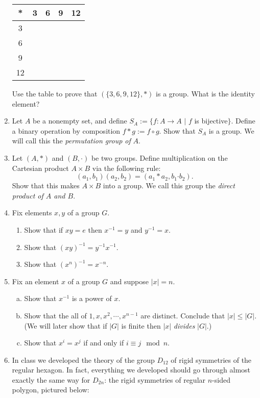 \documentclass[11pt]{article}
\begin{document}
\begin{enumerate}
	      \begin{center}
		      \begin{tabular}{c|c|c|c|c}
			      *  & 3 & 6 & 9 & 12 \\
			      \hline
			      3  &   &   &   &    \\
			      \hline
			      6  &   &   &   &    \\
			      \hline
			      9  &   &   &   &    \\
			      \hline
			      12 &   &   &   &
		      \end{tabular}
	      \end{center}
	      Use the table to prove that $\left(\{3,6,9,12\},*\right)$ is a group.  What is the identity element?
	\item Let $A$ be a nonempty set, and define $S_A:=\{f:A\to A$ $|$ $f$ is bijective$\}$.  Define a binary operation by composition $f*g := f\circ g$.  Show that $S_A$ is a group.  We will call this the \textit{permutation group of }$A$.
  \item{
  Let $(A,*)$ and $(B,\boldsymbol{\cdot})$ be two groups.  Define multiplication on the Cartesian product $A\times B$ via the following rule:
  \[(a_1,b_1)(a_2,b_2) = (a_1*a_2,b_1\boldsymbol{\cdot}b_2).\]
  Show that this makes $A\times B$ into a group.  We call this group the \textit{direct product of $A$ and $B$}.
  }
	\item{
  Fix elements $x,y$ of a group $G$.
  \begin{enumerate}
    \item{
    Show that if $xy=e$ then $x^{-1}=y$ and $y^{-1}=x$.
    }
    \item{
    Show that $(xy)^{-1} = y^{-1}x^{-1}$.
    }
    \item{
    Show that $(x^n)^{-1} = x^{-n}$.
    }
  \end{enumerate}
  }
	\item Fix an element $x$ of a group $G$ and suppose $|x| = n$.
  \begin{enumerate}[(a)]
    \item Show that $x^{-1}$ is a power of $x$.
		\item Show that the all of $1,x,x^2,\cdots,x^{n-1}$ are distinct.  Conclude that $|x|\le|G|$.  (We will later show that if $|G|$ is finite then $|x|$ \textit{divides} $|G|$.)
		\item Show that $x^i=x^j$ if and only if $i\equiv j\mod n$.
	\end{enumerate}
	\item{In class we developed the theory of the group $D_{12}$ of rigid symmetries of the regular hexagon.  In fact, everything we developed should go through almost exactly the same way for $D_{2n}$: the rigid symmetries of regular $n$-sided polygon, pictured below:
}
\end{enumerate}
\end{document}
